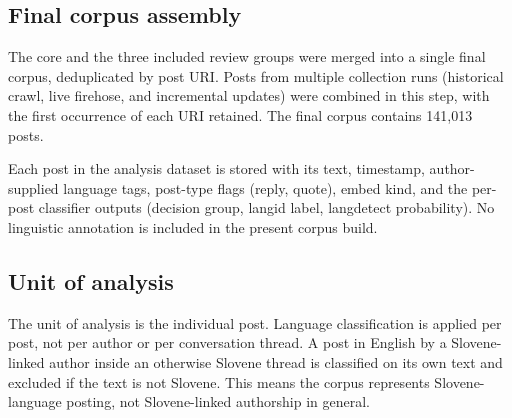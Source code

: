 \subsection{Final corpus assembly}

The core and the three included review groups were merged into a single final corpus, deduplicated by post URI. Posts from multiple collection runs (historical crawl, live firehose, and incremental updates) were combined in this step, with the first occurrence of each URI retained. The final corpus contains 141,013 posts.

Each post in the analysis dataset is stored with its text, timestamp, author-supplied language tags, post-type flags (reply, quote), embed kind, and the per-post classifier outputs (decision group, langid label, langdetect probability). No linguistic annotation is included in the present corpus build.

\subsection{Unit of analysis}

The unit of analysis is the individual post. Language classification is applied per post, not per author or per conversation thread. A post in English by a Slovene-linked author inside an otherwise Slovene thread is classified on its own text and excluded if the text is not Slovene. This means the corpus represents Slovene-language posting, not Slovene-linked authorship in general.
